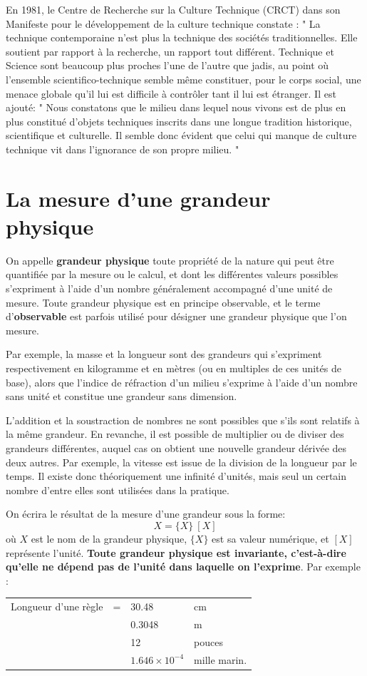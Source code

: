 En 1981, le Centre de Recherche sur la Culture Technique (CRCT) dans son Manifeste pour le développement de la culture technique constate : " La technique contemporaine n'est plus la technique des sociétés traditionnelles. Elle soutient par rapport à la recherche, un rapport tout différent. Technique et Science sont beaucoup plus proches l'une de l'autre que jadis, au point où l'ensemble scientifico-technique semble même constituer, pour le corps social, une menace globale qu'il lui est difficile à contrôler tant il lui est étranger. Il est ajouté: " Nous constatons que le milieu dans lequel nous vivons est de plus en plus constitué d'objets techniques inscrits dans une longue tradition historique, scientifique et culturelle.  Il semble donc évident que celui qui manque de culture technique vit dans l'ignorance de son propre milieu. "

\rm

\section{La mesure d'une grandeur physique}

On appelle \textbf{grandeur physique} toute propriété de la nature qui peut être quantifiée par la mesure ou le calcul, et dont les différentes valeurs possibles s'expriment à l'aide d'un nombre généralement accompagné d'une unité de mesure. Toute grandeur physique est en principe observable, et le terme d'\textbf{observable} est parfois utilisé pour désigner une grandeur physique que l'on mesure.

Par exemple, la masse et la longueur sont des grandeurs qui s'expriment respectivement en kilogramme et en mètres (ou en multiples de ces unités de base), alors que l'indice de réfraction d'un milieu s'exprime à l'aide d'un nombre sans unité et constitue une grandeur sans dimension.

L'addition et la soustraction de nombres ne sont possibles que s'ils sont relatifs à la même grandeur. En revanche, il est possible de multiplier ou de diviser des grandeurs différentes, auquel cas on obtient une nouvelle grandeur dérivée des deux autres. Par exemple, la vitesse est issue de la division de la longueur par le temps. Il existe donc théoriquement une infinité d'unités, mais seul un certain nombre d'entre elles sont utilisées dans la pratique.

On écrira le résultat de la mesure d'une grandeur sous la forme:
$$
X = \{X\}\ [X]
$$
où $X$ est le nom de la grandeur physique, $\{X\}$ est sa valeur numérique, et $[X]$ représente l'unité. \textbf{Toute grandeur physique est invariante, c'est-à-dire qu'elle ne dépend pas de l'unité dans laquelle on l'exprime}. Par exemple :
\begin{table}[htbp]
\begin{flushleft}
\begin{tabular}{lcll}
Longueur d'une règle & = & 30.48 & cm\\
& & 0.3048 & m\\
& & 12 & pouces\\
& & $1.646\times10^{-4}$ & mille marin.
\end{tabular}
\end{flushleft}
\end{table}

